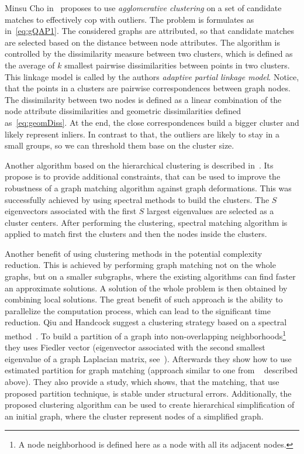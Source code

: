 Minsu Cho in~\cite{Cho2009_AgglClustering} proposes to use \emph{agglomerative clustering} on a set of candidate matches to effectively cop with outliers. The problem is formulates as in~\eqref{eq:gQAP1}. The considered graphs are attributed, so that candidate matches are selected based on the distance between node attributes. The algorithm is controlled by the dissimilarity measure between two clusters, which is defined as the average of $k$ smallest pairwise dissimilarities between points in two clusters. This linkage model is called by the authors \emph{adaptive partial linkage model}. Notice, that the points in a clusters are pairwise correspondences between graph nodes. The dissimilarity between two nodes is defined as a linear combination of the node attribute dissimilarities and 
geometric dissimilarities defined as~\eqref{eq:geomDiss}. At the end, the close correspondences build a bigger cluster and likely represent inliers. In contrast to that, the outliers are likely to stay in a small groups, so we can threshold them base on the cluster size.

Another algorithm based on the hierarchical clustering is described in~\cite{Hancock_ModalClusters}. Its propose is to provide additional constraints, that can be used to improve the robustness of a graph matching algorithm against graph deformations. This was successfully achieved by using spectral methods to build the clusters. The $S$ eigenvectors associated with the first $S$ largest eigenvalues are selected as a cluster centers. After performing the clustering, spectral matching algorithm is applied to match first the clusters and then the nodes inside the clusters.

Another benefit of using clustering methods in the potential complexity reduction. This is achieved by performing graph matching not on the whole graphs, but on a smaller subgraphs, where the existing algorithms can find faster an approximate solutions. A solution of the whole problem is then obtained by combining local solutions. The great benefit of such approach is the ability to parallelize the computation process, which can lead to the significant time reduction.
Qiu and Handcock suggest a clustering strategy based on a spectral method~\cite{Hancock_GM_SpectralPart}. To build a partition of a graph into non-overlapping neighborhoods\footnote{A node neighborhood is defined here as a node with all its adjacent nodes.} they uses Fiedler vector (eigenvector associated with the second smallest eigenvalue of a graph Laplacian matrix, see~\cite{Fiedler1975}). Afterwards they show how to use estimated partition for graph matching (approach similar to one from ~\cite{Hancock_ModalClusters} described above). They also provide a study, which shows, that the matching, that use proposed partition technique, is stable under structural errors. Additionally, the proposed clustering algorithm can be used to create hierarchical simplification of an initial graph, where the cluster represent nodes of a simplified graph.

